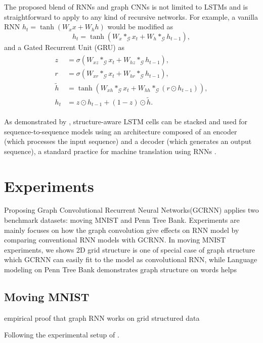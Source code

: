 \documentclass{article} %
\newcommand{\G}{\mathcal{G}}
\newcommand{\todo}[1]{{\color{red} #1 }}
\begin{document}
The proposed blend of RNNs and graph CNNs is not limited to LSTMs and is
straightforward to apply to any kind of recursive networks. For example, a
vanilla RNN $h_t = \tanh(W_x x + W_h h)$ would be modified as
\begin{equation} \label{eqn:vrnn_graph}
	h_t = \tanh(W_x \ast_\G x_t + W_h \ast_\G h_{t-1}),
\end{equation}
and a Gated Recurrent Unit (GRU) \citep{gru} as
\begin{align} \label{eqn:gru_graph}
\begin{split}
	z &= \sigma(W_{xz} \ast_\G x_t + W_{hz} \ast_\G h_{t-1}), \\
	r &= \sigma(W_{xr} \ast_\G x_t + W_{hr} \ast_\G h_{t-1}), \\
	\tilde{h} &= \tanh(W_{xh} \ast_\G x_t + W_{hh} \ast_\G (r \odot h_{t-1})), \\
	h_t &= z \odot h_{t-1} + (1-z) \odot \tilde{h}.
\end{split}
\end{align}

As demonstrated by \citet{convlstm}, structure-aware LSTM cells can be stacked
and used for sequence-to-sequence models using an architecture composed of an
encoder (which processes the input sequence) and a decoder (which generates an
output sequence), a standard practice for machine translation using RNNs
\citep{gru, seq2seq}.

\section{Experiments}
Proposing Graph Convolutional Recurrent Neural Networks(GCRNN) applies two benchmark datasets: moving MNIST\citet{moving_mnist} and Penn Tree Bank\citet{ptb}. Experiments are mainly focuses on how the graph convolution give effects on RNN model by comparing conventional RNN models with GCRNN. In moving MNIST experiments, we shows 2D grid structure is one of special case of graph structure which GCRNN can easily fit to the model as convolutional RNN, while Language modeling on Penn Tree Bank demonstrates graph structure on words helps 

\subsection{Moving MNIST}
\todo{empirical proof that graph RNN works on grid structured data}


Following the experimental setup of \citet{convlstm}.
\end{document}
